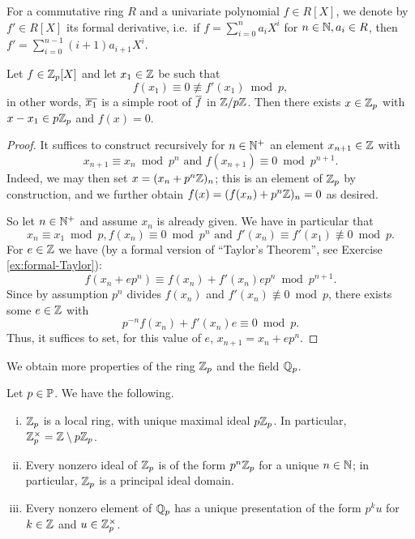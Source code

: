 \documentclass[12pt, leqno, british]{amsart}
\begin{document}
For a commutative ring $R$ and a univariate polynomial $f \in R[X]$, we denote by $f' \in R[X]$ its formal derivative, i.e.~if $f = \sum_{i=0}^n a_i X^i$ for $n \in \mathbb N, a_i \in R$, then $f' = \sum_{i=0}^{n-1} (i+1)a_{i+1}X^i$.
\begin{prop}\label{P:Hensel}
Let $f \in \mathbb Z_p[X]$ and let $x_1 \in \mathbb Z$ be such that
$$ f(x_1) \equiv 0 \not\equiv f'(x_1) \bmod p,$$
in other words, $\overline{x_1}$ is a simple root of $\overline{f}$ in $\mathbb Z/p\mathbb Z$.
Then there exists $x \in \mathbb Z_p$ with $x - x_1 \in p\mathbb Z_p$ and $f(x) = 0$.
\end{prop}
\begin{proof}
It suffices to construct recursively for $n \in \mathbb N^+$ an element $x_{n+1} \in \mathbb Z$ with
$$ x_{n+1} \equiv x_n \bmod p^n \text{ and } f(x_{n+1}) \equiv 0 \bmod p^{n+1}.$$
Indeed, we may then set $x = (x_n + p^n\mathbb Z)_n$; this is an element of $\mathbb Z_p$ by construction, and we further obtain $f(x) = (f(x_n) + p^n\mathbb Z)_n = 0$ as desired.

So let $n \in \mathbb N^+$ and assume $x_{n}$ is already given.
We have in particular that
$$ x_{n} \equiv x_1 \bmod p, f(x_n) \equiv 0 \bmod p^n \text{ and } f'(x_n) \equiv f'(x_1) \not\equiv 0 \bmod p. $$
For $e \in \mathbb Z$ we have (by a formal version of ``Taylor's Theorem'', see Exercise \eqref{ex:formal-Taylor}):
$$ f(x_n + ep^{n}) \equiv f(x_n) + f'(x_n) ep^{n} \bmod p^{n+1}.$$
Since by assumption $p^{n}$ divides $f(x_n)$ and $f'(x_n) \not\equiv 0 \bmod p$, there exists some $e \in \mathbb Z$ with
$$ p^{-n}f(x_n) + f'(x_n)e \equiv 0 \bmod p.$$
Thus, it suffices to set, for this value of $e$, $x_{n+1} = x_n + ep^n$.
\end{proof}
We obtain more properties of the ring $\mathbb Z_p$ and the field $\mathbb Q_p$.
\begin{prop}\label{P:Zp-properties}
Let $p \in \mathbb P$.
We have the following.
\begin{enumerate}[(i)]
\item\label{it:local} $\mathbb Z_p$ is a local ring, with unique maximal ideal $p\mathbb Z_p$.
In particular, $\mathbb Z_p^{\times} = \mathbb Z \setminus p\mathbb Z_p$.
\item\label{it:Zp-ideal-presentation} Every nonzero ideal of $\mathbb Z_p$ is of the form $p^n\mathbb Z_p$ for a unique $n \in \mathbb N$; in particular, $\mathbb Z_p$ is a principal ideal domain.
\item\label{it:Qp-presentation} Every nonzero element of $\mathbb Q_p$ has a unique presentation of the form $p^k u$ for $k \in \mathbb Z$ and $u \in \mathbb Z_p^\times$.
\end{enumerate}
\end{prop}
\end{document}
